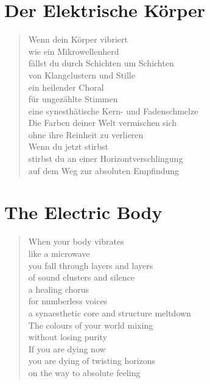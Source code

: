 
\cleartoverso

\section{Der Elektrische Körper}

\begin{verse}

Wenn dein Körper vibriert\\
wie ein Mikrowellenherd\\
fällst du durch Schichten um Schichten\\
von Klangclustern und Stille\\
ein heilender Choral\\
für ungezählte Stimmen\\
eine synesthätische Kern- und Fadenschmelze\\
Die Farben deiner Welt vermischen sich\\
ohne ihre Reinheit zu verlieren\\
Wenn du jetzt stirbst\\
stirbst du an einer Horizontverschlingung\\
auf dem Weg zur absoluten Empfindung

\end{verse}

\clearpage

\section{The Electric Body}

\begin{verse}

When your body vibrates\\
like a microwave\\
you fall through layers and layers\\
of sound clusters and silence\\
a healing chorus\\
for numberless voices\\
a synaesthetic core and structure meltdown\\
The colours of your world mixing\\
without losing purity\\
If you are dying now\\
you are dying of twisting horizons\\
on the way to absolute feeling

\end{verse}
